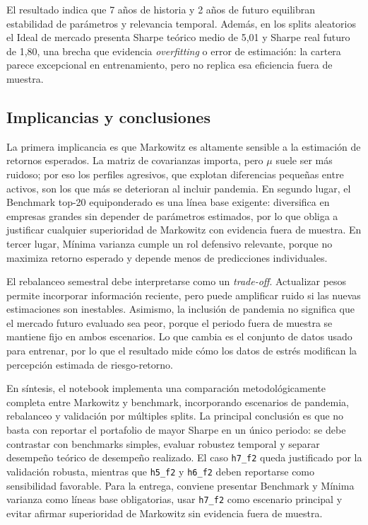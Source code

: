 El resultado indica que 7 a\~nos de historia y 2 a\~nos de futuro equilibran
estabilidad de par\'ametros y relevancia temporal. Adem\'as, en los splits
aleatorios el Ideal de mercado presenta Sharpe te\'orico medio de 5,01 y Sharpe
real futuro de 1,80, una brecha que evidencia \textit{overfitting} o error de
estimaci\'on: la cartera parece excepcional en entrenamiento, pero no replica esa
eficiencia fuera de muestra.

\subsection*{Implicancias y conclusiones}

La primera implicancia es que Markowitz es altamente sensible a la estimaci\'on
de retornos esperados. La matriz de covarianzas importa, pero $\mu$ suele ser
m\'as ruidoso; por eso los perfiles agresivos, que explotan diferencias
peque\~nas entre activos, son los que m\'as se deterioran al incluir pandemia. En
segundo lugar, el Benchmark top-20 equiponderado es una l\'inea base exigente:
diversifica en empresas grandes sin depender de par\'ametros estimados, por lo
que obliga a justificar cualquier superioridad de Markowitz con evidencia fuera
de muestra. En tercer lugar, M\'inima varianza cumple un rol defensivo relevante,
porque no maximiza retorno esperado y depende menos de predicciones individuales.

El rebalanceo semestral debe interpretarse como un \textit{trade-off}.
Actualizar pesos permite incorporar informaci\'on reciente, pero puede amplificar
ruido si las nuevas estimaciones son inestables. Asimismo, la inclusi\'on de
pandemia no significa que el mercado futuro evaluado sea peor, porque el periodo
fuera de muestra se mantiene fijo en ambos escenarios. Lo que cambia es el
conjunto de datos usado para entrenar, por lo que el resultado mide c\'omo los
datos de estr\'es modifican la percepci\'on estimada de riesgo-retorno.

En s\'intesis, el notebook implementa una comparaci\'on metodol\'ogicamente
completa entre Markowitz y benchmark, incorporando escenarios de pandemia,
rebalanceo y validaci\'on por m\'ultiples splits. La principal conclusi\'on es que
no basta con reportar el portafolio de mayor Sharpe en un \'unico periodo: se
debe contrastar con benchmarks simples, evaluar robustez temporal y separar
desempe\~no te\'orico de desempe\~no realizado. El caso \texttt{h7\_f2} queda
justificado por la validaci\'on robusta, mientras que \texttt{h5\_f2} y
\texttt{h6\_f2} deben reportarse como sensibilidad favorable. Para la entrega,
conviene presentar Benchmark y M\'inima varianza como l\'ineas base obligatorias,
usar \texttt{h7\_f2} como escenario principal y evitar afirmar superioridad de
Markowitz sin evidencia fuera de muestra.

